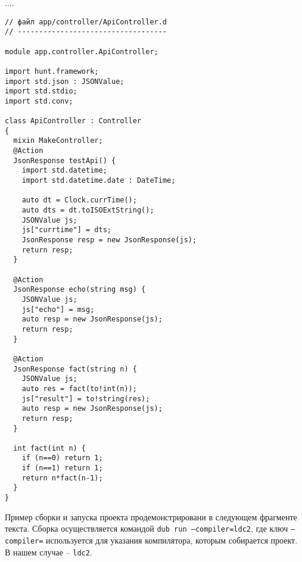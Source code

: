 \documentclass{studrep}
\begin{document}
....
\begin{verbatim}
// файл app/controller/ApiController.d
// -----------------------------------

module app.controller.ApiController;

import hunt.framework;
import std.json : JSONValue;
import std.stdio;
import std.conv;

class ApiController : Controller
{
  mixin MakeController;
  @Action
  JsonResponse testApi() {
    import std.datetime;
    import std.datetime.date : DateTime;

    auto dt = Clock.currTime();
    auto dts = dt.toISOExtString();
    JSONValue js;
    js["currtime"] = dts;
    JsonResponse resp = new JsonResponse(js);
    return resp;
  }

  @Action
  JsonResponse echo(string msg) {
    JSONValue js;
    js["echo"] = msg;
    auto resp = new JsonResponse(js);
    return resp;
  }

  @Action
  JsonResponse fact(string n) {
    JSONValue js;
    auto res = fact(to!int(n));
    js["result"] = to!string(res);
    auto resp = new JsonResponse(js);
    return resp;
  }

  int fact(int n) {
    if (n==0) return 1;
    if (n==1) return 1;
    return n*fact(n-1);
  }
}
\end{verbatim}


Пример сборки и запуска проекта продемонстрировани в следующем фрагменте текста.  Сборка осуществляется командой \texttt{dub run --compiler=ldc2}, где ключ \texttt{--compiler=} используется для указания компилятора, которым собирается проект.  В нашем случае -- \texttt{ldc2}.
\end{document}

